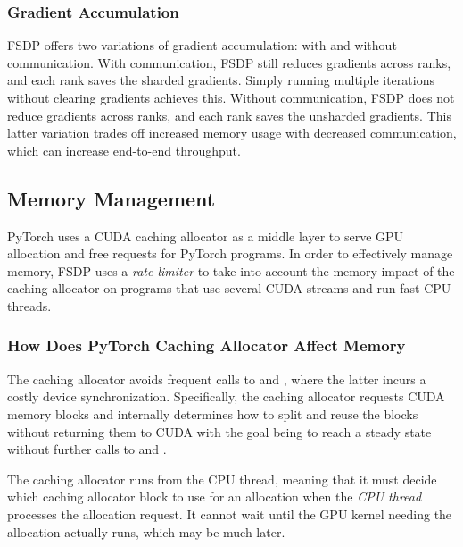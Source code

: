 \subsubsection{Gradient Accumulation} \hfill \break

FSDP offers two variations of gradient accumulation: with and without communication. With communication, FSDP still reduces gradients across ranks, and each rank saves the sharded gradients. Simply running multiple iterations without clearing gradients achieves this. Without communication, FSDP does not reduce gradients across ranks, and each rank saves the unsharded gradients. This latter variation trades off increased memory usage with decreased communication, which can increase end-to-end throughput.


\subsection{Memory Management}\label{sec:memory_management}

PyTorch uses a CUDA caching allocator as a middle layer to serve GPU allocation and free requests for PyTorch programs. In order to effectively manage memory, FSDP uses a \textit{rate limiter} to take into account the memory impact of the caching allocator on programs that use several CUDA streams and run fast CPU threads.

\subsubsection{How Does PyTorch Caching Allocator Affect Memory}
\label{subsubsection:pytorch caching allocator}\hfill \break

The caching allocator avoids frequent calls to  and , where the latter incurs a costly device synchronization. Specifically, the caching allocator requests CUDA memory blocks and internally determines how to split and reuse the blocks without returning them to CUDA with the goal being to reach a steady state without further calls to  and .

The caching allocator runs from the CPU thread, meaning that it must decide which caching allocator block to use for an allocation when the \textit{CPU thread} processes the allocation request. It cannot wait until the GPU kernel needing the allocation actually runs, which may be much later. 

